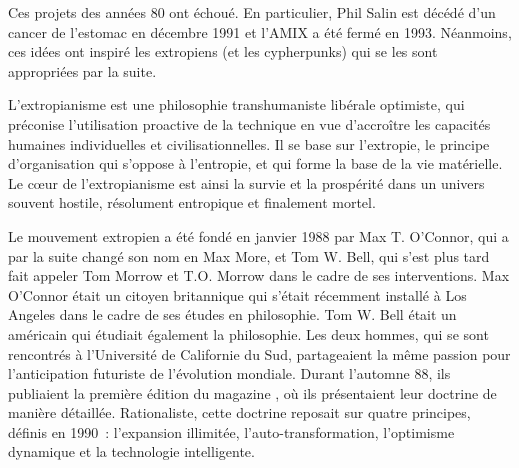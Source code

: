 Ces projets des années 80 ont échoué. En particulier, Phil Salin est décédé d'un cancer de l'estomac en décembre 1991 et l'AMIX a été fermé en 1993. Néanmoins, ces idées ont inspiré les extropiens (et les cypherpunks) qui se les sont appropriées par la suite.


L'extropianisme est une philosophie transhumaniste libérale optimiste, qui préconise l'utilisation proactive de la technique en vue d'accroître les capacités humaines individuelles et civilisationnelles. Il se base sur l'extropie, le principe d'organisation qui s'oppose à l'entropie, et qui forme la base de la vie matérielle. Le cœur de l'extropianisme est ainsi la survie et la prospérité dans un univers souvent hostile, résolument entropique et finalement mortel.

Le mouvement extropien a été fondé en janvier 1988 par Max T. O'Connor, qui a par la suite changé son nom en Max More, et Tom W. Bell, qui s'est plus tard fait appeler Tom Morrow et T.O. Morrow dans le cadre de ses interventions. Max O'Connor était un citoyen britannique qui s'était récemment installé à Los Angeles dans le cadre de ses études en philosophie. Tom W. Bell était un américain qui étudiait également la philosophie. Les deux hommes, qui se sont rencontrés à l'Université de Californie du Sud, partageaient la même passion pour l'anticipation futuriste de l'évolution mondiale. Durant l'automne 88, ils publiaient la première édition du magazine , où ils présentaient leur doctrine de manière détaillée. Rationaliste, cette doctrine reposait sur quatre principes, définis en 1990~: l'expansion illimitée, l'auto-transformation, l'optimisme dynamique et la technologie intelligente.


